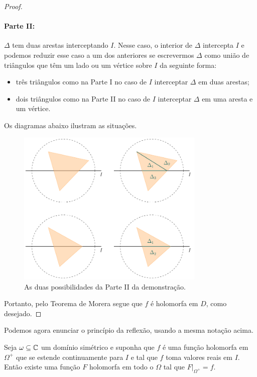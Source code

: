 \begin{proof}
        \paragraph{Parte II:} $\Delta$ tem duas arestas interceptando $I$. Nesse caso, o interior
        de $\Delta$ intercepta $I$ e podemos reduzir esse caso a um dos anteriores se escrevermos 
        $\Delta$ como união de triângulos que têm um lado ou um vértice sobre $I$ da seguinte forma:
        \begin{itemize}
            \item três triângulos como na Parte I no caso de $I$ interceptar $\Delta$
            em duas arestas;
            \item dois triângulos como na Parte II no caso de $I$ interceptar $\Delta$
            em uma aresta e um vértice.
        \end{itemize}
        Os diagramas abaixo ilustram as situações.
        \begin{figure}[H]\centering
            \includegraphics[width=0.8\textwidth]{
                Figuras/slide 16 aula 6.pdf
            }
            \caption{As duas possibilidades da Parte II da demonstração.}
        \end{figure}
        Portanto, pelo Teorema de Morera segue que $f$ é holomorfa em $D$, como desejado.
    \end{proof}
    
    Podemos agora enunciar o princípio da reflexão, usando a mesma notação acima.
    
    \begin{teorema}
    \label{teo-reflexao-schwarz}
        Seja $\omega\subseteq\mathbb{C}$ um domínio simétrico e
        suponha que $f$ é uma função holomorfa em $\Omega^+$ que se estende 
        continuamente para $I$ e tal que $f$ toma valores reais em $I$. 
        Então existe uma função $F$ holomorfa em todo o $\Omega$ tal que
        $F\big|_{\Omega^+} = f$.
    \end{teorema}
        
